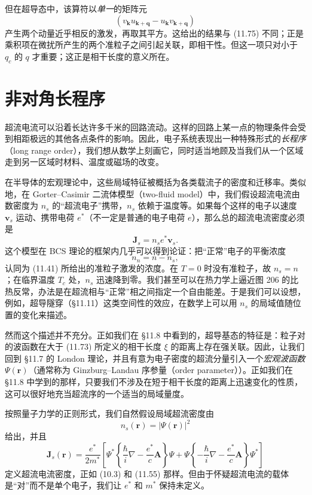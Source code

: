 但在超导态中，该算符以\emph{单一}的矩阵元
\begin{equation*}
(v_{\mathbf{k}}u_{\mathbf{k}+\mathbf{q}} - u_{\mathbf{k}}v_{\mathbf{k}+\mathbf{q}}) \tag{11.76}
\end{equation*}
产生两个动量近乎相反的激发，再取其平方。这给出的结果与 (11.75) 不同；正是乘积项在微扰所产生的两个准粒子之间引起关联，即相干性。但这一项只对小于 $q_c$ 的 $q$ 才重要；这正是相干长度的意义所在。

\section{非对角长程序}

超流电流可以沿着长达许多千米的回路流动。这样的回路上某一点的物理条件会受到相距极远的其他各点条件的影响。因此，电子系统表现出一种特殊形式的\emph{长程序}（long range order），我们想从数学上刻画它，同时适当地顾及当我们从一个区域走到另一区域时材料、温度或磁场的改变。

在半导体的宏观理论中，这些局域特征被概括为各类载流子的密度和迁移率。类似地，在 Gorter--Casimir 二流体模型（two-fluid model）中，我们假设超流电流由数密度为 $n_s$ 的“超流电子”携带，$n_s$ 依赖于温度等。如果每个这样的电子以速度 $\mathbf{v}_s$ 运动、携带电荷 $e^{*}$（不一定是普通的电子电荷 $e$），那么总的超流电流密度必须是
\begin{equation*}
\mathbf{J}_s = n_s e^{*}\mathbf{v}_s. \tag{11.77}
\end{equation*}
这个模型在 BCS 理论的框架内几乎可以得到论证：把“正常”电子的平衡浓度
\begin{equation*}
n_n = n - n_s, \tag{11.78}
\end{equation*}
认同为 (11.41) 所给出的准粒子激发的浓度。在 $T=0$ 时没有准粒子，故 $n_s=n$；在临界温度 $T_c$ 处，$n_s$ 迅速降到零。我们甚至可以在热力学上逼近图 206 的比热反常，办法是在超流相与“正常”相之间指定一个自由能差。于是我们可以设想，例如，超导隧穿（§11.11）这类空间性的效应，在数学上可以用 $n_s$ 的局域值随位置的变化来描述。

然而这个描述并不充分。正如我们在 §11.8 中看到的，超导基态的特征是：粒子对的波函数在大于 (11.73) 所定义的相干长度 $\xi$ 的距离上存在强关联。因此，让我们回到 §11.7 的 London 理论，并且有意为电子密度的超流分量引入一个\emph{宏观波函数} $\Psi(\mathbf{r})$（通常称为 Ginzburg--Landau 序参量（order parameter））。正如我们在 §11.8 中学到的那样，只要我们不涉及在短于相干长度的距离上迅速变化的性质，这可以很好地充当超流序的一个适当的局域量度。

按照量子力学的正则形式，我们自然假设局域超流密度由
\begin{equation*}
n_s(\mathbf{r}) = |\Psi(\mathbf{r})|^{2} \tag{11.79}
\end{equation*}
给出，并且
\begin{equation*}
\mathbf{J}_s(\mathbf{r}) = \frac{e^{*}}{2m^{*}}\left[\Psi^{*}\left\{\frac{\hbar}{i}\nabla - \frac{e^{*}}{c}\mathbf{A}\right\}\Psi + \Psi\left\{-\frac{\hbar}{i}\nabla - \frac{e^{*}}{c}\mathbf{A}\right\}\Psi^{*}\right] \tag{11.80}
\end{equation*}
定义超流电流密度，正如 (10.3) 和 (11.55) 那样。但由于怀疑超流电流的载体是“对”而不是单个电子，我们让 $e^{*}$ 和 $m^{*}$ 保持未定义。

